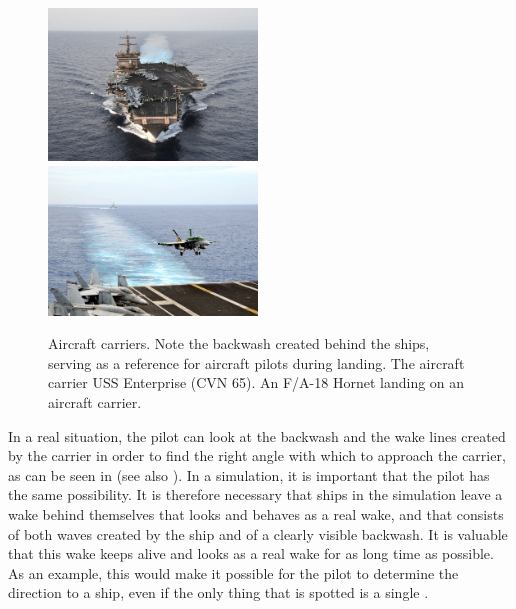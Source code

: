 \begin{figure}
    \centering
    \subcaptionbox{\label{fig:aircraft_carrier_full_wake}} {\includegraphics[width=0.495\textwidth]{Images/Public_domain/The_aircraft_carrier_USS_Enterprise_(CVN_65)}}
    \subcaptionbox{\label{fig:aircraft_carrier_landing_backwash}} {\includegraphics[width=0.495\textwidth]{Images/Public_domain/An_F-A-18C_Hornet_lands_on_the_aircraft_carrier_USS_George_Washington_(CVN_73)}}
    \caption{Aircraft carriers. Note the backwash created behind the ships, serving as a reference for aircraft pilots during landing.  The aircraft carrier USS Enterprise (CVN 65).  An F/A-18 Hornet landing on an aircraft carrier.}
    \label{fig:aircraft_carriers_and_backwash}
\end{figure}

In a real situation, the pilot can look at the backwash and the wake lines created by the carrier in order to find the right angle with which to approach the carrier, as can be seen in \citep{Alivewithpassion2007,MatteoBram2007} (see also ). In a simulation, it is important that the pilot has the same possibility. It is therefore necessary that ships in the simulation leave a wake behind themselves that looks and behaves as a real wake, and that consists of both waves created by the ship and of a clearly visible backwash. It is valuable that this wake keeps alive and looks as a real wake for as long time as possible. As an example, this would make it possible for the pilot to determine the direction to a ship, even if the only thing that is spotted is a single .